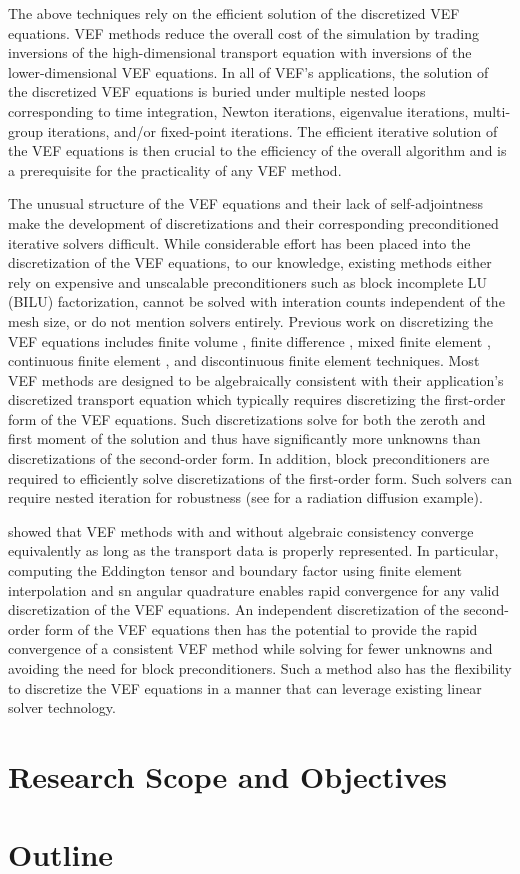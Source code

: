 \documentclass[../doc.tex]{subfiles}
\begin{document}
The above techniques rely on the efficient solution of the discretized VEF equations. VEF methods reduce the overall cost of the simulation by trading inversions of the high-dimensional transport equation with inversions of the lower-dimensional VEF equations. In all of VEF's applications, the solution of the discretized VEF equations is buried under multiple nested loops corresponding to time integration, Newton iterations, eigenvalue iterations, multi-group iterations, and/or fixed-point iterations. The efficient iterative solution of the VEF equations is then crucial to the efficiency of the overall algorithm and is a prerequisite for the practicality of any VEF method. 

The unusual structure of the VEF equations and their lack of self-adjointness make the development of discretizations and their corresponding preconditioned iterative solvers difficult.
While considerable effort has been placed into the discretization of the VEF equations, to our knowledge, existing methods either rely on expensive and unscalable preconditioners such as block incomplete LU (BILU) factorization, cannot be solved with interation counts independent of the mesh size, or do not mention solvers entirely. Previous work on discretizing the VEF equations includes finite volume \cite{anistratov_fvm,doi:10.1080/00411459308203810,QDBC,Jiang_2012,Jones2019TheQM}, finite difference \cite{WIESELQUIST2014343}, mixed finite element \cite{vallette,me,olivier_mandc,LOU2019258}, continuous finite element \cite{wieselquist,two-level-independent-warsa}, and discontinuous finite element \cite{dima_dfem} techniques. Most VEF methods are designed to be algebraically consistent with their application's discretized transport equation which typically requires discretizing the first-order form of the VEF equations. Such discretizations solve for both the zeroth and first moment of the solution and thus have significantly more unknowns than discretizations of the second-order form. In addition, block preconditioners \cite{benzi_golub_liesen_2005} are required to efficiently solve discretizations of the first-order form. Such solvers can require nested iteration for robustness (see \cite{warsa_mfem} for a radiation diffusion example). 

\textcite{two-level-independent-warsa} showed that VEF methods with and without algebraic consistency converge equivalently as long as the transport data is properly represented. In particular, computing the Eddington tensor and boundary factor using finite element interpolation and \gls{sn} angular quadrature enables rapid convergence for any valid discretization of the VEF equations. An independent discretization of the second-order form of the VEF equations then has the potential to provide the rapid convergence of a consistent VEF method while solving for fewer unknowns and avoiding the need for block preconditioners. Such a method also has the flexibility to discretize the VEF equations in a manner that can leverage existing linear solver technology.

\section{Research Scope and Objectives}

\section{Outline}
\end{document}

